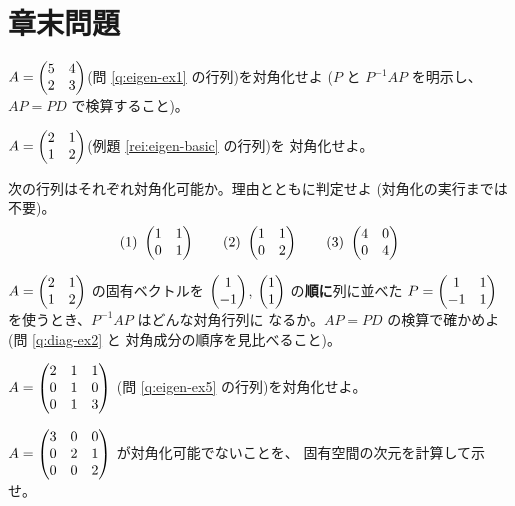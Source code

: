 \section*{章末問題}

\begin{mondai}[基本]\label{q:diag-ex1}
$A = \begin{pmatrix}5 & 4 \\ 2 & 3\end{pmatrix}$(問 \ref{q:eigen-ex1} の行列)を対角化せよ
($P$ と $P^{-1}AP$ を明示し、$AP = PD$ で検算すること)。
\end{mondai}

\begin{mondai}[基本]\label{q:diag-ex2}
$A = \begin{pmatrix}2 & 1 \\ 1 & 2\end{pmatrix}$(例題 \ref{rei:eigen-basic} の行列)を
対角化せよ。
\end{mondai}

\begin{mondai}[基本]\label{q:diag-ex3}
次の行列はそれぞれ対角化可能か。理由とともに判定せよ
(対角化の実行までは不要)。
\[
(1)\ \begin{pmatrix}1 & 1 \\ 0 & 1\end{pmatrix} \qquad
(2)\ \begin{pmatrix}1 & 1 \\ 0 & 2\end{pmatrix} \qquad
(3)\ \begin{pmatrix}4 & 0 \\ 0 & 4\end{pmatrix}
\]
\end{mondai}

\begin{mondai}[基本]\label{q:diag-ex4}
$A = \begin{pmatrix}2 & 1 \\ 1 & 2\end{pmatrix}$ の固有ベクトルを
$\begin{pmatrix}1 \\ -1\end{pmatrix}$, $\begin{pmatrix}1 \\ 1\end{pmatrix}$ の\textbf{順に}列に並べた
$P = \begin{pmatrix}1 & 1 \\ -1 & 1\end{pmatrix}$ を使うとき、$P^{-1}AP$ はどんな対角行列に
なるか。$AP = PD$ の検算で確かめよ(問 \ref{q:diag-ex2} と
対角成分の順序を見比べること)。
\end{mondai}

\begin{mondai}[標準]\label{q:diag-ex5}
$A = \begin{pmatrix}2 & 1 & 1 \\ 0 & 1 & 0 \\ 0 & 1 & 3\end{pmatrix}$
(問 \ref{q:eigen-ex5} の行列)を対角化せよ。
\end{mondai}

\begin{mondai}[標準]\label{q:diag-ex6}
$A = \begin{pmatrix}3 & 0 & 0 \\ 0 & 2 & 1 \\ 0 & 0 & 2\end{pmatrix}$ が対角化可能でないことを、
固有空間の次元を計算して示せ。
\end{mondai}

